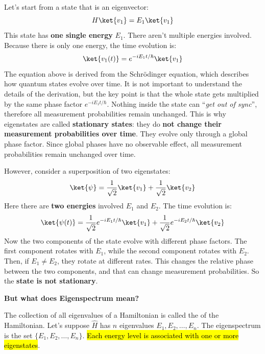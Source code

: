 \highspace
Let's start from a state that is an eigenvector:
\begin{equation*}
    H\ket{v_{1}} = E_{1} \ket{v_{1}}
\end{equation*}
This state has \textbf{one single energy} $E_{1}$. There aren't multiple energies involved. Because there is only one energy, the time evolution is:
\begin{equation*}
    \ket{v_{1}(t)} = e^{-iE_{1}t/\hbar} \ket{v_{1}}
\end{equation*}
The equation above is derived from the Schrödinger equation, which describes how quantum states evolve over time. It is not important to understand the details of the derivation, but the key point is that the whole state gets multiplied by the same phase factor $e^{-iE_{1}t/\hbar}$. Nothing inside the state can ``\emph{get out of sync}'', therefore all measurement probabilities remain unchanged. This is why eigenstates are called \textbf{stationary states}: they do \textbf{not change their measurement probabilities over time}. They evolve only through a global phase factor. Since global phases have no observable effect, all measurement probabilities remain unchanged over time.

\highspace
However, consider a superposition of two eigenstates:
\begin{equation*}
    \ket{\psi} = \frac{1}{\sqrt{2}}\ket{v_1} + \frac{1}{\sqrt{2}}\ket{v_2}
\end{equation*}
Here there are \textbf{two energies} involved $E_{1}$ and $E_{2}$. The time evolution is:
\begin{equation*}
    \ket{\psi(t)} = \frac{1}{\sqrt{2}}e^{-iE_{1}t/\hbar}\ket{v_1} + \frac{1}{\sqrt{2}}e^{-iE_{2}t/\hbar}\ket{v_2}
\end{equation*}
Now the two components of the state evolve with different phase factors. The first component rotates with $E_{1}$, while the second component rotates with $E_{2}$. Then, if $E_1 \neq E_2$, they rotate at different rates. This changes the relative phase between the two components, and that can change measurement probabilities. So the \textbf{state is not stationary}.

\highspace
\begin{flushleft}
    \textcolor{Green3}{ \textbf{But what does Eigenspectrum mean?}}
\end{flushleft}
The collection of all eigenvalues of a Hamiltonian is called the  of the Hamiltonian. Let's suppose $\hat{H}$ has $n$ eigenvalues $E_1, E_2, \ldots, E_n$. The eigenspectrum is the set $\{E_1, E_2, \ldots, E_n\}$. \hl{Each energy level is associated with one or more eigenstates}.

